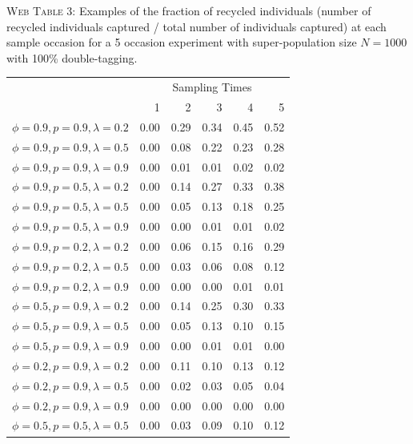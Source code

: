 \documentclass[]{article}
\begin{document}
\clearpage

\textsc{Web Table 3:} Examples of the fraction of recycled individuals
(number of recycled individuals captured / total number of individuals
captured) at each sample occasion for a 5 occasion experiment with
super-population size \(N=1000\) with 100\% double-tagging.

\begin{table}[ht]
\begin{tabular}{rrrrrr}
  \hline
  & \multicolumn{5}{c}{Sampling Times}\\
 & 1 & 2 & 3 & 4 & 5 \\ 
  \hline
 $\phi=0.9, p=0.9, \lambda=0.2$  & 0.00 & 0.29 & 0.34 & 0.45 & 0.52 \\ 
  $\phi=0.9, p=0.9, \lambda=0.5$  & 0.00 & 0.08 & 0.22 & 0.23 & 0.28 \\ 
  $\phi=0.9, p=0.9, \lambda=0.9$  & 0.00 & 0.01 & 0.01 & 0.02 & 0.02 \\ \hline 
  $\phi=0.9, p=0.5, \lambda=0.2$  & 0.00 & 0.14 & 0.27 & 0.33 & 0.38 \\ 
  $\phi=0.9, p=0.5, \lambda=0.5$  & 0.00 & 0.05 & 0.13 & 0.18 & 0.25 \\ 
  $\phi=0.9, p=0.5, \lambda=0.9$  & 0.00 & 0.00 & 0.01 & 0.01 & 0.02 \\ \hline
  $\phi=0.9, p=0.2, \lambda=0.2$  & 0.00 & 0.06 & 0.15 & 0.16 & 0.29 \\ 
  $\phi=0.9, p=0.2, \lambda=0.5$ & 0.00 & 0.03 & 0.06 & 0.08 & 0.12 \\ 
  $\phi=0.9, p=0.2, \lambda=0.9$ & 0.00 & 0.00 & 0.00 & 0.01 & 0.01 \\ \hline
  $\phi=0.5, p=0.9, \lambda=0.2$ & 0.00 & 0.14 & 0.25 & 0.30 & 0.33 \\ 
  $\phi=0.5, p=0.9, \lambda=0.5$ & 0.00 & 0.05 & 0.13 & 0.10 & 0.15 \\ 
  $\phi=0.5, p=0.9, \lambda=0.9$ & 0.00 & 0.00 & 0.01 & 0.01 & 0.00 \\ \hline
  $\phi=0.2, p=0.9, \lambda=0.2$ & 0.00 & 0.11 & 0.10 & 0.13 & 0.12 \\ 
  $\phi=0.2, p=0.9, \lambda=0.5$  & 0.00 & 0.02 & 0.03 & 0.05 & 0.04 \\ 
  $\phi=0.2, p=0.9, \lambda=0.9$  & 0.00 & 0.00 & 0.00 & 0.00 & 0.00 \\ \hline
    $\phi=0.5, p=0.5, \lambda=0.5$ & 0.00 & 0.03 & 0.09 & 0.10 & 0.12 \\ \hline
\end{tabular}
\end{table}
\end{document}
